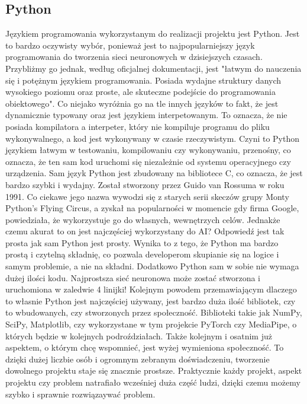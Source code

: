 \documentclass[12pt]{article}
\begin{document}
\begin{sloppypar}
{  \subsection{Python}
  {
    Językiem programowania wykorzystanym do realizacji projektu jest Python. 
    Jest to bardzo oczywisty wybór, ponieważ jest to najpopularniejszy język programowania do tworzenia sieci neuronowych w dzisiejszych czasach.
    Przybliżmy go jednak, według oficjalnej dokumentacji, jest "łatwym do nauczenia się i potężnym językiem programowania. 
    Posiada wydajne struktury danych wysokiego poziomu oraz proste, ale skuteczne podejście do programowania obiektowego"\cite{'python-docs'}.
    Co niejako wyróżnia go na tle innych języków to fakt, że jest dynamicznie typowany oraz jest językiem interpetowanym. 
    To oznacza, że nie posiada kompilatora a interpeter, który nie kompiluje programu do pliku wykonywalnego, a kod jest wykonywany w czasie rzeczywistym.
    Czyni to Python językiem łatwym w testowaniu, kompilowaniu czy wykonywaniu, przenośny, co oznacza, że ten sam kod uruchomi się niezależnie od systemu operacyjnego czy urządzenia.
    Sam język Python jest zbudowany na bibliotece C, co oznacza, że jest bardzo szybki i wydajny. 
    Został stworzony przez Guido van Rossuma w roku 1991.
    Co ciekawe jego nazwa wywodzi się z starych serii skeczów grupy Monty Python’s Flying Circus, 
    a zyskał na popularności w momencie gdy firma Google, powiedziała, że wykorzystuje go do własnych, wewnętrzych celów.
    \newline
    Jednakże czemu akurat to on jest najczęściej wykorzystany do AI? Odpowiedź jest tak prosta jak sam Python jest prosty.
    Wynika to z tego, że Python ma bardzo prostą i czytelną składnię, co pozwala developerom skupianie się na logice i samym problemie, a nie na składni\cite{'python-ai'}.
    Dodatkowo Python sam w sobie nie wymaga dużej ilości kodu. Najprostsza sieć neuronowa może zostać stworzona i uruchomiona w zaledwie 4 linijki!
    Kolejnym powodem przemawiającym dlaczego to własnie Python jest najczęściej używany, 
    jest bardzo duża ilość bibliotek, czy to wbudowanych, czy stworzonych przez społeczność. 
    Biblioteki takie jak NumPy, SciPy, Matplotlib, czy wykorzystane w tym projekcie PyTorch czy MediaPipe, o których będzie w kolejnych podroździałach.
    Także kolejnym i osatnim już aspektem, o którym chcę wspomnieć, jest wyżej wymieniona społeczność. 
    To dzięki dużej liczbie osób i ogromnym zebranym doświadczeniu, tworzenie dowolnego projektu staje się znacznie prostsze. 
    Praktycznie każdy projekt, aspekt projektu czy problem natrafiało wcześniej duża część ludzi, dzięki czemu możemy szybko i sprawnie rozwiązaywać problem.
  }
}
\end{sloppypar}
\end{document}
